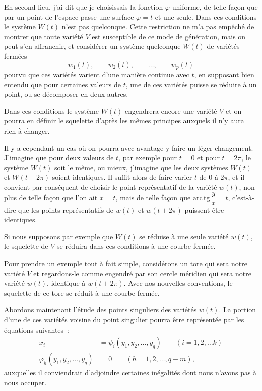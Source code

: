 \documentclass{article}
\begin{document}
En second lieu, j'ai dit que je choisissais la fonction $\varphi$ uniforme, de telle façon que par un point de l'espace passe une surface $\varphi = t$ et une seule. Dans ces conditions le système $W(t)$ n'est pas quelconque. Cette restriction ne m'a pas empêché de montrer que toute variété $V$ est susceptible de ce mode de génération, mais on peut s'en affranchir, et considérer un système quelconque $W(t)$ de variétés fermées
\[ w_{1}(t), \qquad w_{2}(t), \qquad \ldots, \qquad w_{p}(t) \]
pourvu que ces variétés varient d'une manière continue avec $t$, en supposant bien entendu que pour certaines valeurs de $t$, une de ces variétés puisse se réduire à un point, ou se décomposer en deux autres.

Dans ces conditions le système $W(t)$ engendrera encore une variété $V$ et on pourra en définir le squelette d'après les mêmes principes auxquels il n'y aura rien à changer.

Il y a cependant un cas où on pourra avec avantage y faire un léger changement. J'imagine que pour deux valeurs de $t$, par exemple pour $t = 0$ et pour $t = 2\pi$, le système $W(t)$ soit le même, ou mieux, j'imagine que les deux systèmes $W(t)$ et $W(t + 2\pi)$ soient identiques. Il suffit alors de faire varier $t$ de 0 à $2\pi$, et il convient par conséquent de choisir le point représentatif de la variété $w(t)$, non plus de telle façon que l'on ait $x = t$, mais de telle façon que $\mathrm{arc\,tg}\,\dfrac{y}{x} = t$, c'est-à-dire que les points représentatifs de $w(t)$ et $w(t + 2\pi)$ puissent être identiques.

Si nous supposons par exemple que $W(t)$ se réduise à une seule variété $w(t)$, le squelette de $V$ se réduira dans ces conditions à une courbe fermée.


Pour prendre un exemple tout à fait simple, considérons un tore qui sera notre variété $V$ et regardons-le comme engendré par son cercle méridien qui sera notre variété $w(t)$, identique à $w(t + 2\pi)$. Avec nos nouvelles conventions, le squelette de ce tore se réduit à une courbe fermée.

Abordons maintenant l'étude des points singuliers des variétés $w(t)$. La portion d'une de ces variétés voisine du point singulier pourra être représentée par les équations suivantes~:
\[ \begin{aligned} x_{i} &= \psi_{i}(y_{1}, y_{2}, \ldots, y_{q}) \qquad (i = 1, 2, \ldots k)\\ \varphi_{h}(y_{1}, y_{2}, \ldots, y_{q}) &= 0 \qquad (h = 1, 2, \ldots, q - m), \end{aligned} \]
auxquelles il conviendrait d'adjoindre certaines inégalités dont nous n'avons pas à nous occuper.
\end{document}
